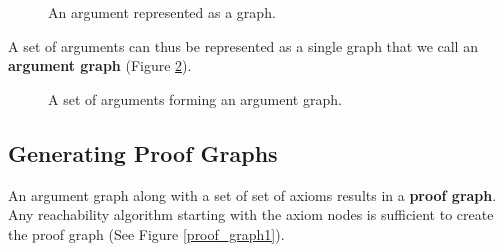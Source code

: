 \documentclass[a4paper]{article}
\begin{document}
\begin{figure}[htbp]
\begin{center}
\caption{An argument represented as a graph.}
\label{argument}
\end{center}
\end{figure}

A set of arguments can thus be represented as a single graph that we call an \textbf{argument graph} (Figure \ref{argument_graph}).

\begin{figure}[htbp]
\begin{center}
\caption{A set of arguments forming an argument graph.}
\label{argument_graph}
\end{center}
\end{figure}


\subsection{Generating Proof Graphs}
An argument graph along with a set of set of axioms results in a \textbf{proof graph}. Any reachability algorithm starting with the axiom nodes is sufficient to create the proof graph (See Figure \ref{proof_graph1}).
\end{document}
